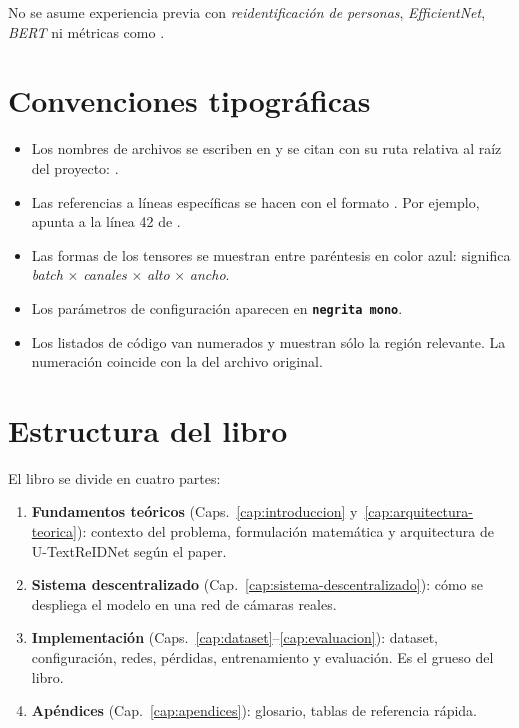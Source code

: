 No se asume experiencia previa con \emph{reidentificación de personas},
\emph{EfficientNet}, \emph{BERT} ni métricas como .

\section{Convenciones tipográficas}

\begin{itemize}
  \item Los nombres de archivos se escriben en
         y se citan con su ruta relativa
        al raíz del proyecto: .
  \item Las referencias a líneas específicas se hacen con el formato
        . Por ejemplo, 
        apunta a la línea 42 de .
  \item Las formas de los tensores se muestran entre paréntesis en
        color azul:  significa
        \emph{batch} × \emph{canales} × \emph{alto} × \emph{ancho}.
  \item Los parámetros de configuración aparecen en
        \texttt{\textbf{negrita mono}}.
  \item Los listados de código van numerados y muestran sólo la región
        relevante. La numeración coincide con la del archivo
        original.
\end{itemize}

\section{Estructura del libro}

El libro se divide en cuatro partes:

\begin{enumerate}
  \item \textbf{Fundamentos teóricos} (Caps.~\ref{cap:introduccion}
        y~\ref{cap:arquitectura-teorica}): contexto del problema,
        formulación matemática y arquitectura de U-TextReIDNet según
        el paper.
  \item \textbf{Sistema descentralizado} (Cap.~\ref{cap:sistema-descentralizado}):
        cómo se despliega el modelo en una red de cámaras reales.
  \item \textbf{Implementación} (Caps.~\ref{cap:dataset}--\ref{cap:evaluacion}):
        dataset, configuración, redes, pérdidas, entrenamiento y
        evaluación. Es el grueso del libro.
  \item \textbf{Apéndices} (Cap.~\ref{cap:apendices}): glosario,
        tablas de referencia rápida.
\end{enumerate}

